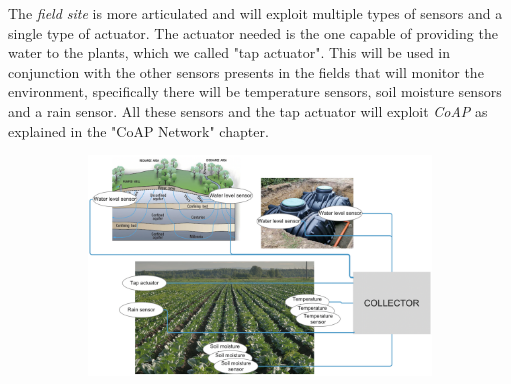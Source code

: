 The \textit{field site} is more articulated and will exploit multiple types of sensors and a single type of actuator. The actuator needed is the one capable of providing the water to the plants, which we called "tap actuator". This will be used in conjunction with the other sensors presents in the fields that will monitor the environment, specifically there will be temperature sensors, soil moisture sensors and a rain sensor. 
All these sensors and the tap actuator will exploit \textit{CoAP} as explained in the "CoAP Network" chapter.


\begin{figure}[H]
	\begin{subfigure}{\textwidth}
	\centering
		\includegraphics[width=0.66\linewidth]{img/deployment.png} 
	\end{subfigure}
\end{figure}